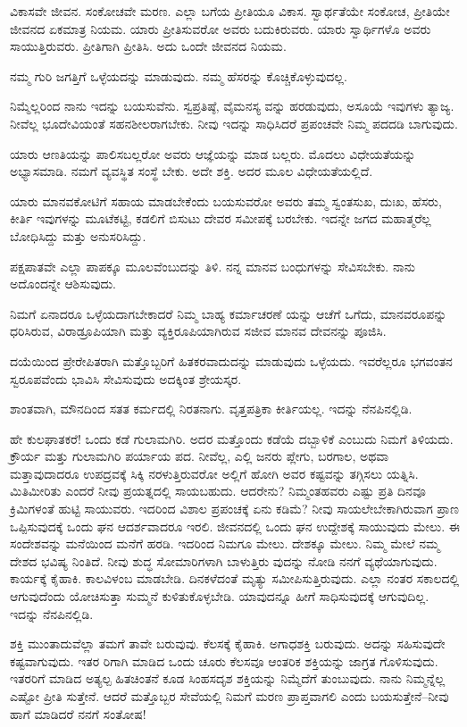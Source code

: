 ವಿಕಾಸವೇ ಜೀವನ. ಸಂಕೋಚವೇ ಮರಣ. ಎಲ್ಲಾ ಬಗೆಯ ಪ್ರೀತಿಯೂ ವಿಕಾಸ. ಸ್ವಾರ್ಥತೆಯೇ ಸಂಕೋಚ, ಪ್ರೀತಿಯೇ ಜೀವನದ ಏಕಮಾತ್ರ ನಿಯಮ. ಯಾರು ಪ್ರೀತಿಸುವರೋ ಅವರು ಬದುಕಿರುವರು. ಯಾರು ಸ್ವಾರ್ಥಿಗಳೊ ಅವರು ಸಾಯುತ್ತಿರುವರು. ಪ್ರೀತಿಗಾಗಿ ಪ್ರೀತಿಸಿ. ಅದು ಒಂದೇ ಜೀವನದ ನಿಯಮ.

ನಮ್ಮ ಗುರಿ ಜಗತ್ತಿಗೆ ಒಳ್ಳೆಯದನ್ನು ಮಾಡುವುದು. ನಮ್ಮ ಹೆಸರನ್ನು ಕೊಚ್ಚಿಕೊಳ್ಳುವುದಲ್ಲ.

ನಿಮ್ಮೆಲ್ಲರಿಂದ ನಾನು ಇದನ್ನು ಬಯಸುವೆನು. ಸ್ವಪ್ರತಿಷ್ಠೆ, ವೈಮನಸ್ಯ ವನ್ನು ಹರಡುವುದು, ಅಸೂಯೆ ಇವುಗಳು ತ್ಯಾಜ್ಯ. ನೀವೆಲ್ಲ ಭೂದೇವಿಯಂತೆ ಸಹನಶೀಲರಾಗಬೇಕು. ನೀವು ಇದನ್ನು ಸಾಧಿಸಿದರೆ ಪ್ರಪಂಚವೇ ನಿಮ್ಮ ಪದದಡಿ ಬಾಗುವುದು.

ಯಾರು ಆಣತಿಯನ್ನು ಪಾಲಿಸಬಲ್ಲರೋ ಅವರು ಆಜ್ಞೆಯನ್ನು ಮಾಡ ಬಲ್ಲರು. ಮೊದಲು ವಿಧೇಯತೆಯನ್ನು ಅಭ್ಯಾಸಮಾಡಿ. ನಮಗೆ ವ್ಯವಸ್ಥಿತ ಸಂಸ್ಥೆ ಬೇಕು. ಅದೇ ಶಕ್ತಿ. ಅದರ ಮೂಲ ವಿಧೇಯತೆಯಲ್ಲಿದೆ.

ಯಾರು ಮಾನವಕೋಟಿಗೆ ಸಹಾಯ ಮಾಡಬೇಕೆಂದು ಬಯಸುವರೋ ಅವರು ತಮ್ಮ ಸ್ವಂತಸುಖ, ದುಃಖ, ಹೆಸರು, ಕೀರ್ತಿ ಇವುಗಳನ್ನು ಮೂಟೆಕಟ್ಟಿ, ಕಡಲಿಗೆ ಬಿಸುಟು ದೇವರ ಸಮೀಪಕ್ಕೆ ಬರಬೇಕು. ಇದನ್ನೇ ಜಗದ ಮಹಾತ್ಮರೆಲ್ಲ ಬೋಧಿಸಿದ್ದು ಮತ್ತು ಅನುಸರಿಸಿದ್ದು.

ಪಕ್ಷಪಾತವೇ ಎಲ್ಲಾ ಪಾಪಕ್ಕೂ ಮೂಲವೆಂಬುದನ್ನು ತಿಳಿ. ನನ್ನ ಮಾನವ ಬಂಧುಗಳನ್ನು ಸೇವಿಸಬೇಕು. ನಾನು ಅದೊಂದನ್ನೇ ಆಶಿಸುವುದು.

ನಿಮಗೆ ಏನಾದರೂ ಒಳ್ಳೆಯದಾಗಬೇಕಾದರೆ ನಿಮ್ಮ ಬಾಹ್ಯ ಕರ್ಮಾಚರಣೆ ಯನ್ನು ಆಚೆಗೆ ಒಗೆದು, ಮಾನವರೂಪನ್ನು ಧರಿಸಿರುವ, ವಿರಾಡ್ರೂಪಿಯಾಗಿ ಮತ್ತು ವ್ಯಕ್ತಿರೂಪಿಯಾಗಿರುವ ಸಜೀವ ಮಾನವ ದೇವನನ್ನು ಪೂಜಿಸಿ.

ದಯೆಯಿಂದ ಪ್ರೇರೇಪಿತರಾಗಿ ಮತ್ತೊಬ್ಬರಿಗೆ ಹಿತಕರವಾದುದನ್ನು ಮಾಡುವುದು ಒಳ್ಳೆಯದು. ಇವರೆಲ್ಲರೂ ಭಗವಂತನ ಸ್ವರೂಪವೆಂದು ಭಾವಿಸಿ ಸೇವಿಸುವುದು ಅದಕ್ಕಿಂತ ಶ್ರೇಯಸ್ಕರ.

ಶಾಂತವಾಗಿ, ಮೌನದಿಂದ ಸತತ ಕರ್ಮದಲ್ಲಿ ನಿರತನಾಗು. ವೃತ್ತಪತ್ರಿಕಾ ಕೀರ್ತಿಯಲ್ಲ. ಇದನ್ನು ನೆನಪಿನಲ್ಲಿಡಿ.

ಹೇ ಕುಲಘಾತಕರೆ! ಒಂದು ಕಡೆ ಗುಲಾಮಗಿರಿ. ಅದರ ಮತ್ತೊಂದು ಕಡೆಯೆ ದಬ್ಬಾಳಿಕೆ ಎಂಬುದು ನಿಮಗೆ ತಿಳಿಯದು. ಕ್ರೌರ್ಯ ಮತ್ತು ಗುಲಾಮಗಿರಿ ಪರ್ಯಾಯ ಪದ. ನೀವೆಲ್ಲ, ಎಲ್ಲಿ ಜನರು ಪ್ಲೇಗು, ಬರಗಾಲ, ಅಥವಾ ಮತ್ತಾವುದಾದರೂ ಉಪದ್ರವಕ್ಕೆ ಸಿಕ್ಕಿ ನರಳುತ್ತಿರುವರೋ ಅಲ್ಲಿಗೆ ಹೋಗಿ ಅವರ ಕಷ್ಟವನ್ನು ತಗ್ಗಿಸಲು ಯತ್ನಿಸಿ. ಮಿತಿಮೀರಿತು ಎಂದರೆ ನೀವು ಪ್ರಯತ್ನದಲ್ಲಿ ಸಾಯಬಹುದು. ಆದರೇನು? ನಿಮ್ಮಂತಹವರು ಎಷ್ಟು ಪ್ರತಿ ದಿನವೂ ಕ್ರಿಮಿಗಳಂತೆ ಹುಟ್ಟಿ ಸಾಯುವರು. ಇದರಿಂದ ವಿಶಾಲ ಪ್ರಪಂಚಕ್ಕೆ ಏನು ಕಡಿಮೆ? ನೀವು ಸಾಯಲೇಬೇಕಾಗಿರುವಾಗ ಪ್ರಾಣ ಒಪ್ಪಿಸುವುದಕ್ಕೆ ಒಂದು ಘನ ಆದರ್ಶವಾದರೂ ಇರಲಿ. ಜೀವನದಲ್ಲಿ ಒಂದು ಘನ ಉದ್ದೇಶಕ್ಕೆ ಸಾಯುವುದು ಮೇಲು. ಈ ಸಂದೇಶವನ್ನು ಮನೆಯಿಂದ ಮನೆಗೆ ಹರಡಿ. ಇದರಿಂದ ನಿಮಗೂ ಮೇಲು. ದೇಶಕ್ಕೂ ಮೇಲು. ನಿಮ್ಮ ಮೇಲೆ ನಮ್ಮ ದೇಶದ ಭವಿಷ್ಯ ನಿಂತಿದೆ. ನೀವು ಶುದ್ಧ ಸೋಮಾರಿಗಳಾಗಿ ಬಾಳುತ್ತಿರು ವುದನ್ನು ನೋಡಿ ನನಗೆ ವ್ಯಥೆಯಾಗುವುದು. ಕಾರ್ಯಕ್ಕೆ ಕೈಹಾಕಿ. ಕಾಲವಿಳಂಬ ಮಾಡಬೇಡಿ. ದಿನಕಳೆದಂತೆ ಮೃತ್ಯು ಸಮೀಪಿಸುತ್ತಿರುವುದು. ಎಲ್ಲಾ ನಂತರ ಸಕಾಲದಲ್ಲಿ ಆಗುವುದೆಂದು ಯೋಚಿಸುತ್ತಾ ಸುಮ್ಮನೆ ಕುಳಿತುಕೊಳ್ಳಬೇಡಿ. ಯಾವುದನ್ನೂ ಹೀಗೆ ಸಾಧಿಸುವುದಕ್ಕೆ ಆಗುವುದಿಲ್ಲ. ಇದನ್ನು ನೆನಪಿನಲ್ಲಿಡಿ.

ಶಕ್ತಿ ಮುಂತಾದುವೆಲ್ಲಾ ತಮಗೆ ತಾವೇ ಬರುವುವು. ಕೆಲಸಕ್ಕೆ ಕೈಹಾಕಿ. ಅಗಾಧಶಕ್ತಿ ಬರುವುದು. ಅದನ್ನು ಸಹಿಸುವುದೇ ಕಷ್ಟವಾಗುವುದು. ಇತರ ರಿಗಾಗಿ ಮಾಡಿದ ಒಂದು ಚೂರು ಕೆಲಸವೂ ಆಂತರಿಕ ಶಕ್ತಿಯನ್ನು ಜಾಗ್ರತ ಗೊಳಿಸುವುದು. ಇತರರಿಗೆ ಮಾಡಿದ ಅತ್ಯಲ್ಪ ಹಿತಚಿಂತನೆ ಕೂಡ ಸಿಂಹಸದೃಶ ಶಕ್ತಿಯನ್ನು ನಿಮ್ಮೆದೆಗೆ ತುಂಬುವುದು. ನಾನು ನಿಮ್ಮನ್ನೆಲ್ಲ ಎಷ್ಟೋ ಪ್ರೀತಿ ಸುತ್ತೇನೆ. ಆದರೆ ಮತ್ತೊಬ್ಬರ ಸೇವೆಯಲ್ಲಿ ನಿಮಗೆ ಮರಣ ಪ್ರಾಪ್ತವಾಗಲಿ ಎಂದು ಬಯಸುತ್ತೇನೆ–ನೀವು ಹಾಗೆ ಮಾಡಿದರೆ ನನಗೆ ಸಂತೋಷ!


